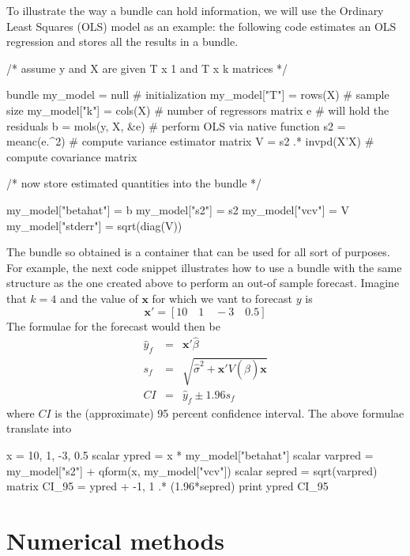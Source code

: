 To illustrate the way a bundle can hold information, we will use the
Ordinary Least Squares (OLS) model as an example: the following code
estimates an OLS regression and stores all the results in a bundle.

\begin{code}
/* assume y and X are given T x 1 and T x k matrices */

bundle my_model = null               # initialization
my_model["T"] = rows(X)              # sample size
my_model["k"] = cols(X)              # number of regressors
matrix e                             # will hold the residuals
b = mols(y, X, &e)                   # perform OLS via native function
s2 = meanc(e.^2)                     # compute variance estimator
matrix V = s2 .* invpd(X'X)          # compute covariance matrix

/* now store estimated quantities into the bundle */

my_model["betahat"] = b
my_model["s2"] = s2
my_model["vcv"] = V
my_model["stderr"] = sqrt(diag(V))
\end{code}

The bundle so obtained is a container that can be used for all sort of
purposes. For example, the next code snippet illustrates how to use
a bundle with the same structure as the one created above to perform
an out-of sample forecast. Imagine that $k=4$ and the value of
$\mathbf{x}$ for which we vant to forecast $y$ is
\[
  \mathbf{x}' = [ 10 \quad 1  \quad -3 \quad 0.5 ]
\]
The formulae for the forecast would then be
\begin{eqnarray*}
  \hat{y}_f & = & \mathbf{x}'\hat{\beta} \\
  s_f & = & \sqrt{\hat{\sigma}^2 + \mathbf{x}'V(\hat{\beta})\mathbf{x}} \\
  CI & = & \hat{y}_f \pm 1.96 s_f 
\end{eqnarray*}
where $CI$ is the (approximate) 95 percent confidence interval. The
above formulae translate into
\begin{code}
  x = { 10, 1, -3, 0.5 }
  scalar ypred    = x * my_model["betahat"]
  scalar varpred  = my_model["s2"] + qform(x, my_model["vcv"])
  scalar sepred   = sqrt(varpred)
  matrix CI_95    = ypred + {-1, 1} .* (1.96*sepred)
  print ypred CI_95
\end{code}





\chapter{Numerical methods}


